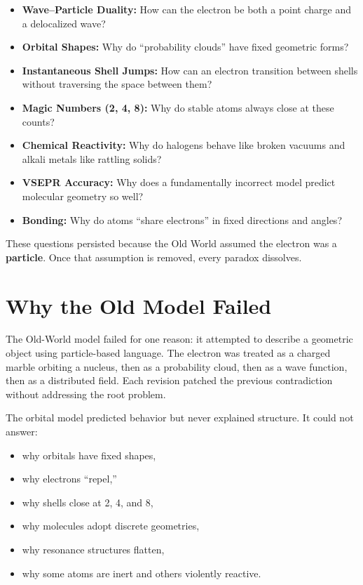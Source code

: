 \documentclass[11pt, letterpaper, openany]{book}
\begin{document}
\begin{itemize}
    \item \textbf{Wave–Particle Duality:} How can the electron be both a point charge and a
    delocalized wave?
    \item \textbf{Orbital Shapes:} Why do “probability clouds” have fixed geometric forms?
    \item \textbf{Instantaneous Shell Jumps:} How can an electron transition between shells
    without traversing the space between them?
    \item \textbf{Magic Numbers (2, 4, 8):} Why do stable atoms always close at these counts?
    \item \textbf{Chemical Reactivity:} Why do halogens behave like broken vacuums and alkali
    metals like rattling solids?
    \item \textbf{VSEPR Accuracy:} Why does a fundamentally incorrect model predict molecular
    geometry so well?
    \item \textbf{Bonding:} Why do atoms “share electrons” in fixed directions and angles?
\end{itemize}

These questions persisted because the Old World assumed the electron was a
\textbf{particle}. Once that assumption is removed, every paradox dissolves.

\section{Why the Old Model Failed}

The Old-World model failed for one reason: it attempted to describe a geometric object
using particle-based language. The electron was treated as a charged marble orbiting a
nucleus, then as a probability cloud, then as a wave function, then as a distributed field.
Each revision patched the previous contradiction without addressing the root problem.

The orbital model predicted behavior but never explained structure. It could not answer:

\begin{itemize}
    \item why orbitals have fixed shapes,
    \item why electrons “repel,”
    \item why shells close at 2, 4, and 8,
    \item why molecules adopt discrete geometries,
    \item why resonance structures flatten,
    \item why some atoms are inert and others violently reactive.
\end{itemize}
\end{document}
